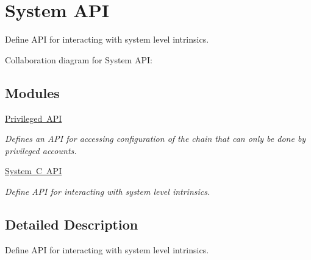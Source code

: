 \hypertarget{group__systemapi}{}\section{System A\+PI}
\label{group__systemapi}


Define A\+PI for interacting with system level intrinsics.  


Collaboration diagram for System A\+PI\+:
\subsection*{Modules}
\begin{DoxyCompactItemize}
\item 
\mbox{\hyperlink{group__privilegedapi}{Privileged A\+PI}}
\begin{DoxyCompactList}\small\item\em Defines an A\+PI for accessing configuration of the chain that can only be done by privileged accounts. \end{DoxyCompactList}\item 
\mbox{\hyperlink{group__systemcapi}{System C A\+PI}}
\begin{DoxyCompactList}\small\item\em Define A\+PI for interacting with system level intrinsics. \end{DoxyCompactList}\end{DoxyCompactItemize}


\subsection{Detailed Description}
Define A\+PI for interacting with system level intrinsics. 


